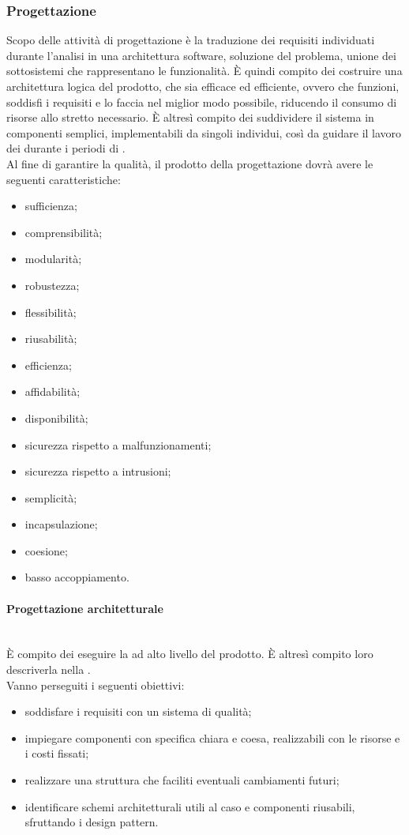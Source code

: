 \subsubsection{Progettazione}
Scopo delle attività di progettazione è la traduzione dei requisiti individuati durante l'analisi in una architettura software, soluzione del problema, unione dei sottosistemi che rappresentano le funzionalità.
È quindi compito dei \Progettisti{} costruire una architettura logica del prodotto, che sia efficace ed efficiente, ovvero che funzioni, soddisfi i requisiti e lo faccia nel miglior modo possibile, riducendo il consumo di risorse allo stretto necessario. È altresì compito dei \Progettisti{} suddividere il sistema in componenti semplici, implementabili da singoli individui, così da guidare il lavoro dei \Programmatori{} durante i periodi di \Cod{}.\\
Al fine di garantire la qualità, il prodotto della progettazione dovrà avere le seguenti caratteristiche:
\begin{itemize}
	\item sufficienza;
	\item comprensibilità;
	\item modularità;
	\item robustezza;
	\item flessibilità;
	\item riusabilità;
	\item efficienza;
	\item affidabilità;
	\item disponibilità;
	\item sicurezza rispetto a malfunzionamenti;
	\item sicurezza rispetto a intrusioni;
	\item semplicità;
	\item incapsulazione;
	\item coesione;
	\item basso accoppiamento.
\end{itemize}

\paragraph{Progettazione architetturale}\mbox{}\\
\`{E} compito dei \Progettisti{} eseguire la \PA{} ad alto livello del prodotto. È altresì compito loro descriverla nella \SpecificaTecnica.\\
Vanno perseguiti i seguenti obiettivi:
\begin{itemize}
	\item soddisfare i requisiti con un sistema di qualità;
	\item impiegare componenti con specifica chiara e coesa, realizzabili con le risorse e i costi fissati;
	\item realizzare una struttura che faciliti eventuali cambiamenti futuri;
	\item identificare schemi architetturali utili al caso e componenti riusabili, sfruttando i design pattern.
\end{itemize}

